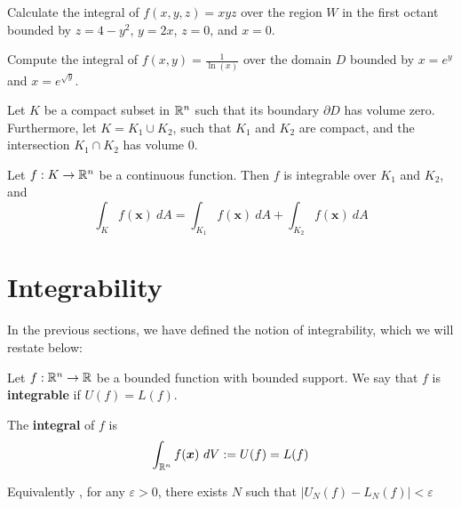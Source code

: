     \begin{remark}
    \end{remark}

    \begin{example}
    Calculate the integral of $f(x,y,z) = xyz$ over the region $W$ in the first octant bounded by $z = 4 - y^2$, $y = 2x$, $z = 0$, and $x= 0$.
    \end{example}

    \begin{example}
        Compute the integral of $f(x,y) = \frac{1}{\ln(x)}$ over the domain $D$ bounded by $x = e^y$ and $x= e^{\sqrt{y}}$.
    \end{example}

\begin{theorem}
        Let $K$ be a compact subset in $\mathbb{R}^n$ such that its boundary $\partial D$ has volume zero.  Furthermore, let $K = K_1 \cup K_2$, such that $K_1$ and $K_2$ are compact, and the intersection $K_1 \cap K_2$ has volume 0. 
    
    
    Let $f : K \to \mathbb{R}^n$ be a continuous function.  Then $f$ is integrable over $K_1$ and $K_2$, and 
    $$\int_K f(\bm{x}) \ dA = \int_{K_1} f(\bm{x}) \ dA + \int_{K_2} f(\bm{x}) \ dA $$ 
    \end{theorem}














\section{Integrability}\label{sec:integrability}

In the previous sections, we have defined the notion of integrability, which we will restate below:

\begin{definition}
    Let $f: \mathbb{R}^n \to \mathbb{R}$ be a bounded function with bounded support.
    We say that $f$ is \textbf{integrable} if $U(f) = L(f)$.
    
    The \textbf{integral} of $f$ is $$\int_{\mathbb{R}^n} f(\bm{x}) \ dV := U(f) = L(f)$$

    Equivalently , for any $\varepsilon > 0$,
    there exists $N$ such that $|U_N(f) - L_N(f)| < \varepsilon$
    \end{definition}

